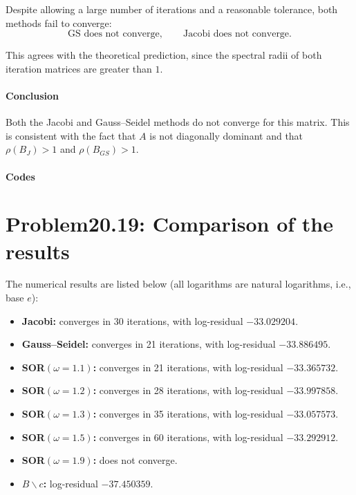 \documentclass{ctexart}
\begin{document}
Despite allowing a large number of iterations and a reasonable tolerance, both methods fail to converge:
\[
  \text{GS does not converge},\qquad
  \text{Jacobi does not converge}.
\]

This agrees with the theoretical prediction, since the spectral radii of both iteration matrices are greater than $1$.

\paragraph{Conclusion}

Both the Jacobi and Gauss--Seidel methods do not converge for this matrix. This is consistent with the fact that $A$ is not diagonally dominant and that $\rho(B_J)>1$ and $\rho(B_{GS})>1$.
\paragraph{Codes}

% 
% 
\newpage
\section{Problem20.19: Comparison of the results}
The numerical results are listed below (all logarithms are natural logarithms, i.e., base $e$):
\begin{itemize}
  \item \textbf{Jacobi:} converges in 30 iterations, with log-residual $-33.029204$.
  \item \textbf{Gauss--Seidel:} converges in 21 iterations, with log-residual $-33.886495$.
  \item \textbf{SOR$(\omega=1.1)$:} converges in 21 iterations, with log-residual $-33.365732$.
  \item \textbf{SOR$(\omega=1.2)$:} converges in 28 iterations, with log-residual $-33.997858$.
  \item \textbf{SOR$(\omega=1.3)$:} converges in 35 iterations, with log-residual $-33.057573$.
  \item \textbf{SOR$(\omega=1.5)$:} converges in 60 iterations, with log-residual $-33.292912$.
  \item \textbf{SOR$(\omega=1.9)$:} does not converge.
  \item \textbf{$B\backslash c$:} log-residual $-37.450359$.
\end{itemize}
\end{document}
